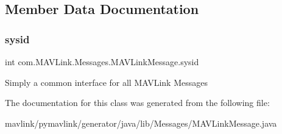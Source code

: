 \subsection{Member Data Documentation}
\mbox{\label{classcom_1_1MAVLink_1_1Messages_1_1MAVLinkMessage_addeab3d19c1a864d569978302031792a}} 
\subsubsection{\texorpdfstring{sysid}{sysid}}
{\footnotesize\ttfamily int com.\+M\+A\+V\+Link.\+Messages.\+M\+A\+V\+Link\+Message.\+sysid}

Simply a common interface for all M\+A\+V\+Link Messages 

The documentation for this class was generated from the following file\+:\begin{DoxyCompactItemize}
\item 
mavlink/pymavlink/generator/java/lib/\+Messages/M\+A\+V\+Link\+Message.\+java\end{DoxyCompactItemize}
